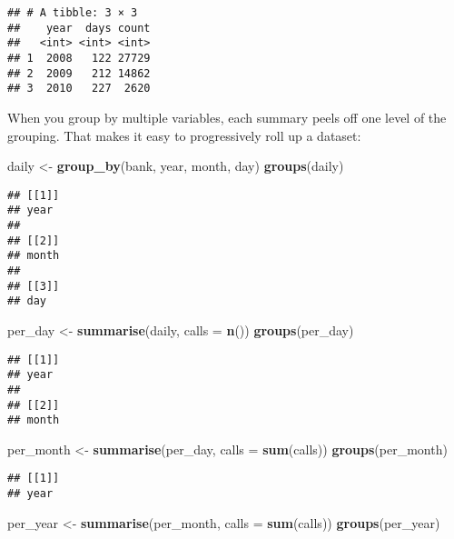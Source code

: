 \documentclass[]{book}
\newenvironment{Shaded}{\begin{snugshade}}{\end{snugshade}}
\newcommand{\KeywordTok}[1]{\textcolor[rgb]{0.13,0.29,0.53}{\textbf{{#1}}}}
\newcommand{\DataTypeTok}[1]{\textcolor[rgb]{0.13,0.29,0.53}{{#1}}}
\newcommand{\StringTok}[1]{\textcolor[rgb]{0.31,0.60,0.02}{{#1}}}
\newcommand{\NormalTok}[1]{{#1}}
\begin{document}
\begin{verbatim}
## # A tibble: 3 × 3
##    year  days count
##   <int> <int> <int>
## 1  2008   122 27729
## 2  2009   212 14862
## 3  2010   227  2620
\end{verbatim}

When you group by multiple variables, each summary peels off one level
of the grouping. That makes it easy to progressively roll up a dataset:

\begin{Shaded}
\begin{Highlighting}[]
\NormalTok{daily <-}\StringTok{ }\KeywordTok{group_by}\NormalTok{(bank, year, month, day)}
\KeywordTok{groups}\NormalTok{(daily)}
\end{Highlighting}
\end{Shaded}

\begin{verbatim}
## [[1]]
## year
## 
## [[2]]
## month
## 
## [[3]]
## day
\end{verbatim}

\begin{Shaded}
\begin{Highlighting}[]
\NormalTok{per_day <-}\StringTok{ }\KeywordTok{summarise}\NormalTok{(daily, }\DataTypeTok{calls =} \KeywordTok{n}\NormalTok{())}
\KeywordTok{groups}\NormalTok{(per_day)}
\end{Highlighting}
\end{Shaded}

\begin{verbatim}
## [[1]]
## year
## 
## [[2]]
## month
\end{verbatim}

\begin{Shaded}
\begin{Highlighting}[]
\NormalTok{per_month <-}\StringTok{ }\KeywordTok{summarise}\NormalTok{(per_day, }\DataTypeTok{calls =} \KeywordTok{sum}\NormalTok{(calls))}
\KeywordTok{groups}\NormalTok{(per_month)}
\end{Highlighting}
\end{Shaded}

\begin{verbatim}
## [[1]]
## year
\end{verbatim}

\begin{Shaded}
\begin{Highlighting}[]
\NormalTok{per_year <-}\StringTok{ }\KeywordTok{summarise}\NormalTok{(per_month, }\DataTypeTok{calls =} \KeywordTok{sum}\NormalTok{(calls))}
\KeywordTok{groups}\NormalTok{(per_year)}
\end{Highlighting}
\end{Shaded}
\end{document}
